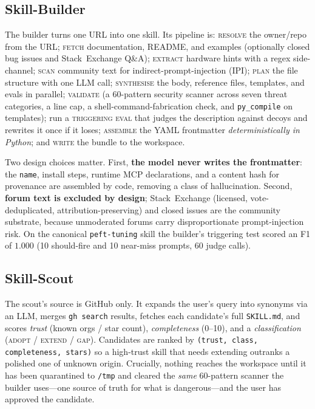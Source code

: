 \documentclass[11pt,a4paper]{article}
\begin{document}
\subsection{Skill-Builder}

The builder turns one URL into one skill. Its pipeline is:
\textsc{resolve} the owner/repo from the URL; \textsc{fetch} documentation, README, and
examples (optionally closed bug issues and Stack~Exchange Q\&A); \textsc{extract}
hardware hints with a regex side-channel; \textsc{scan} community text for
indirect-prompt-injection (IPI); \textsc{plan} the file structure with one LLM call;
\textsc{synthesise} the body, reference files, templates, and evals in parallel;
\textsc{validate} (a 60-pattern security scanner across seven threat categories, a
line cap, a shell-command-fabrication check, and \texttt{py\_compile} on templates);
run a \textsc{triggering eval} that judges the description against decoys and rewrites
it once if it loses; \textsc{assemble} the YAML frontmatter \emph{deterministically in
Python}; and \textsc{write} the bundle to the workspace.

Two design choices matter. First, \textbf{the model never writes the frontmatter}: the
\texttt{name}, install steps, runtime MCP declarations, and a content hash for
provenance are assembled by code, removing a class of hallucination. Second,
\textbf{forum text is excluded by design}; Stack~Exchange (licensed, vote-deduplicated,
attribution-preserving) and closed issues are the community substrate, because
unmoderated forums carry disproportionate prompt-injection risk. On the canonical
\texttt{peft-tuning} skill the builder's triggering test scored an F1 of $1.000$
(10 should-fire and 10 near-miss prompts, 60 judge calls).

\subsection{Skill-Scout}

The scout's source is GitHub only. It expands the user's query into synonyms via an
LLM, merges \texttt{gh search} results, fetches each candidate's full \texttt{SKILL.md},
and scores \emph{trust} (known orgs / star count), \emph{completeness} (0--10), and a
\emph{classification} (\textsc{adopt} / \textsc{extend} / \textsc{gap}). Candidates are
ranked by \texttt{(trust, class, completeness, stars)} so a high-trust skill that needs
extending outranks a polished one of unknown origin. Crucially, nothing reaches the
workspace until it has been quarantined to \texttt{/tmp} and cleared the \emph{same}
60-pattern scanner the builder uses---one source of truth for what is dangerous---and
the user has approved the candidate.
\end{document}
